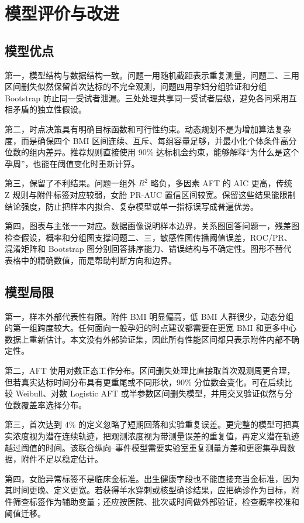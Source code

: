 \documentclass[UTF8,a4paper,12pt]{ctexart}
\begin{document}
\section{模型评价与改进}

\subsection{模型优点}

第一，模型结构与数据结构一致。问题一用随机截距表示重复测量，问题二、三用区间删失似然保留首次达标的不完全观测，问题四用孕妇分组验证和分组 Bootstrap 防止同一受试者泄漏。三处处理共享同一受试者层级，避免各问采用互相矛盾的独立性假设。

第二，时点决策具有明确目标函数和可行性约束。动态规划不是为增加算法复杂度，而是确保四个 BMI 区间连续、互斥、每组容量足够，并最小化个体条件高分位数的组内差异。推荐规则直接使用 90\% 达标机会约束，能够解释“为什么是这个孕周”，也能在阈值变化时重新计算。

第三，保留了不利结果。问题一组外 $R^2$ 略负，多因素 AFT 的 AIC 更高，传统 Z 规则与附件标签对应较弱，女胎 PR-AUC 置信区间较宽。保留这些结果能限制结论强度，防止把样本内拟合、复杂模型或单一指标误写成普遍优势。

第四，图表与主张一一对应。数据画像说明样本边界，关系图回答问题一，残差图检查假设，概率和分组图支撑问题二、三，敏感性图传播阈值误差，ROC/PR、混淆矩阵和 Bootstrap 图分别回答排序能力、错误结构与不确定性。图形不替代表格中的精确数值，而是帮助判断方向和边界。

\subsection{模型局限}

第一，样本外部代表性有限。附件 BMI 明显偏高，低 BMI 人群很少，动态分组的第一组跨度较大。任何面向一般孕妇的时点建议都需要在更宽 BMI 和更多中心数据上重新估计。本文没有外部验证集，因此所有性能区间都只表示附件内部不确定性。

第二，AFT 使用对数正态工作分布。区间删失处理比直接取首次观测周更合理，但若真实达标时间分布具有更重尾或不同形状，90\% 分位数会变化。可在后续比较 Weibull、对数 Logistic AFT 或半参数区间删失模型，并用交叉验证似然与分位数覆盖率选择分布。

第三，首次达到 4\% 的定义忽略了短期回落和实验重复误差。更完整的模型可把真实浓度视为潜在连续轨迹，把观测浓度视为带测量误差的重复值，再定义潜在轨迹越过阈值的时间。该联合纵向--事件模型需要实验室重复测量方差和更密集孕周数据，附件不足以稳定估计。

第四，女胎异常标签不是临床金标准。出生健康字段也不能直接充当金标准，因为其时间更晚、定义更宽。若获得羊水穿刺或核型确诊结果，应把确诊作为目标，附件筛查标签作为辅助变量；还应按医院、批次或时间做外部验证，检查概率校准和阈值迁移。
\end{document}
